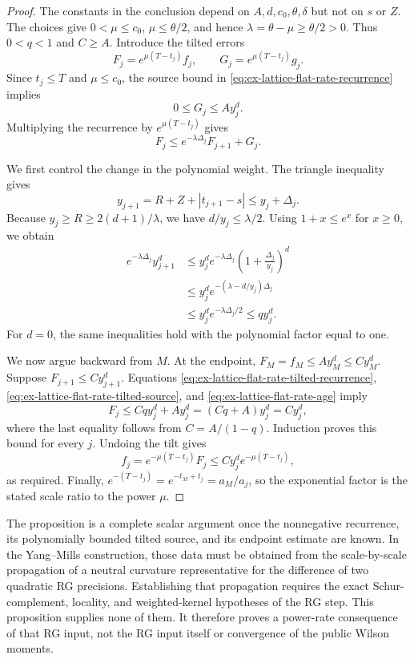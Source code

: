 \begin{proof}
The constants in the conclusion depend on $A,d,c_0,\theta,\delta$ but not on
$s$ or $Z$. The choices give $0<\mu\leq c_0$, $\mu\leq\theta/2$, and hence
$\lambda=\theta-\mu\geq\theta/2>0$. Thus $0<q<1$ and $C\geq A$.
Introduce the tilted errors
\[
 F_j=e^{\mu(T-t_j)}f_j,\qquad
 G_j=e^{\mu(T-t_j)}g_j.
\]
Since $t_j\leq T$ and $\mu\leq c_0$, the source bound in
\eqref{eq:ex-lattice-flat-rate-recurrence} implies
\begin{equation}
 0\leq G_j\leq A y_j^d.
 \label{eq:ex-lattice-flat-rate-tilted-source}
\end{equation}
Multiplying the recurrence by $e^{\mu(T-t_j)}$ gives
\begin{equation}
 F_j\leq e^{-\lambda\Delta_j}F_{j+1}+G_j.
 \label{eq:ex-lattice-flat-rate-tilted-recurrence}
\end{equation}

We first control the change in the polynomial weight. The triangle
inequality gives
\[
 y_{j+1}=R+Z+|t_{j+1}-s|\leq y_j+\Delta_j.
\]
Because $y_j\geq R\geq2(d+1)/\lambda$, we have
$d/y_j\leq\lambda/2$. Using $1+x\leq e^x$ for $x\geq0$, we obtain
\begin{equation}
\begin{split}
 e^{-\lambda\Delta_j}y_{j+1}^d
 &\leq y_j^d e^{-\lambda\Delta_j}
       \left(1+\frac{\Delta_j}{y_j}\right)^d\\
 &\leq y_j^d e^{-(\lambda-d/y_j)\Delta_j}\\
 &\leq y_j^d e^{-\lambda\Delta_j/2}
 \leq q y_j^d.
 \end{split}
 \label{eq:ex-lattice-flat-rate-age}
\end{equation}
For $d=0$, the same inequalities hold with the polynomial factor equal to one.

We now argue backward from $M$. At the endpoint,
$F_M=f_M\leq A y_M^d\leq C y_M^d$. Suppose $F_{j+1}\leq C y_{j+1}^d$.
Equations \eqref{eq:ex-lattice-flat-rate-tilted-recurrence},
\eqref{eq:ex-lattice-flat-rate-tilted-source}, and
\eqref{eq:ex-lattice-flat-rate-age} imply
\[
 F_j\leq Cq y_j^d+A y_j^d=(Cq+A)y_j^d=C y_j^d,
\]
where the last equality follows from $C=A/(1-q)$. Induction proves this bound
for every $j$. Undoing the tilt gives
\[
 f_j=e^{-\mu(T-t_j)}F_j
 \leq C y_j^d e^{-\mu(T-t_j)},
\]
as required. Finally,
$e^{-(T-t_j)}=e^{-t_M+t_j}=a_M/a_j$, so the exponential factor is the
stated scale ratio to the power $\mu$.
\end{proof}

\begin{remark}
\label{rem:ex-lattice-flat-rate-scope}
The proposition is a complete scalar argument once the nonnegative recurrence,
its polynomially bounded tilted source, and its endpoint estimate are known.
In the Yang--Mills construction, those data must be obtained from the
scale-by-scale propagation of a neutral curvature representative for the
difference of two quadratic RG precisions. Establishing that propagation
requires the exact Schur-complement, locality, and weighted-kernel hypotheses
of the RG step. This proposition supplies none of them. It therefore proves a
power-rate consequence of that RG input, not the RG input itself or convergence
of the public Wilson moments.
\end{remark}
